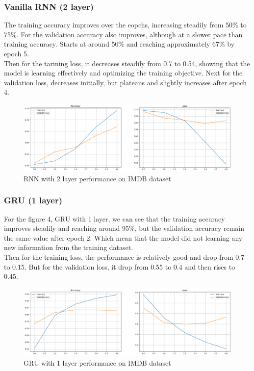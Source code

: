 \documentclass[12pt,a4paper]{article}
\begin{document}
\subsubsection{Vanilla RNN (2 layer)}
The training accuracy improves over the eopchs, increasing steadily from 50\% to 75\%. For the validation accuracy also improves, although at a slower pace than training accuracy. Starts at around 50\% and reaching approximately 67\% by epoch 5.
\\[1ex]
Then for the tarining loss, it decreases steadily from 0.7 to 0.54, showing that the model is learning effectively and optimizing the training objective. Next for the validation loss, decreases initially, but plateaus and slightly increases after epoch 4. 
\newpage
\begin{figure}[h!]
    \centering
    \includegraphics[width=1\textwidth]{../Pic/rnn2.png} 
    \caption{RNN with 2 layer performance on IMDB dataset}
\end{figure}
\subsubsection{GRU (1 layer)}
For the figure 4, GRU with 1 layer, we can see that the training accuracy improves steadily and reaching around 95\%, but the validation accuracy remain the same value after epoch 2. Which mean that the model did not learning any new information from the training dataset. 
\\[1ex]
Then for the training loss, the performance is relatively good and drop from 0.7 to 0.15. But for the validation loss, it drop from 0.55 to 0.4 and then rises to 0.45. 
\begin{figure}[h!]
    \centering
    \includegraphics[width=1\textwidth]{../Pic/gru1.png} 
    \caption{GRU with 1 layer performance on IMDB dataset}
\end{figure}
\end{document}
